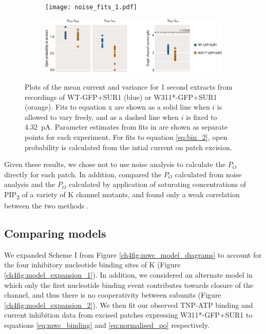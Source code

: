 \begin{figure}[h]
	\centering
	\begin{subfigure}[t]{0.9\textwidth}
		\caption{}\label{ch4fig:noise_fits_1}
		\centering
		\texttt{[image: noise\_fits\_1.pdf]}
	\end{subfigure}
	\vfill
	\begin{subfigure}[t]{0.9\textwidth}
		\caption{}\label{ch4fig:noise_fits_2}
		\centering
		\includegraphics[width=\textwidth]{noise_fits_2.pdf}
	\end{subfigure}
	\caption[Estimating open probability from stationary noise analysis]{
	 Plots of the mean current and variance for 1 second extracts from recordings of WT-GFP+SUR1 (blue) or W311*-GFP+SUR1 (orange).
	Fits to equation x are shown as a solid line when $i$ is allowed to vary freely, and as a dashed line when $i$ is fixed to \SI{4.32}{\pico\ampere}.
	 Parameter estimates from fits in  are shown as separate points for each experiment.
	For fits to equation \ref{eq:bin_2}, open probability is calculated from the intial current on patch excision.
	}\label{ch4fig:all_noise_fits}
\end{figure}

Given these results, we chose not to use noise analysis to calculate the $P_O$ directly for each patch.
In addition, \citeauthor{cukras_role_2002} compared the $P_O$ calculated from noise analysis and the $P_O$ calculated by application of saturating concentrations of PIP\textsubscript{2} of a variety of K\ATP{} channel mutants, and found only a weak correlation between the two methods \cite{cukras_role_2002}.

\subsection{Comparing models}

We expanded Scheme I from Figure \ref{ch4fig:mwc_model_diagrams} to account for the four inhibitory nucleotide binding sites of K\ATP{} (Figure \ref{ch4fig:model_expansion_1}).
In addition, we considered an alternate model in which only the first nucleotide binding event contributes towards closure of the channel, and thus there is no cooperativity between subunits (Figure \ref{ch4fig:model_expansion_2}).
We then fit our observed TNP-ATP binding and current inhibition data from excised patches expressing W311*-GFP+SUR1 to equations \ref{eq:mwc_binding} and \ref{eq:normalised_po} respectively.

